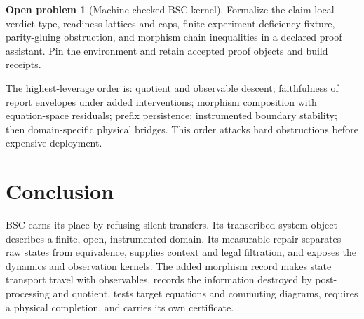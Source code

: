 \documentclass[11pt,a4paper]{article}
\theoremstyle{definition}
\newtheorem{openproblem}[definition]{Open problem}
\theoremstyle{plain}
\theoremstyle{remark}
\begin{document}
\begin{openproblem}[Machine-checked BSC kernel]
Formalize the claim-local verdict type, readiness lattices and caps, finite experiment
deficiency fixture, parity-gluing obstruction, and morphism chain inequalities
in a declared proof assistant.  Pin the environment and retain accepted proof
objects and build receipts.
\end{openproblem}

The highest-leverage order is: quotient and observable descent; faithfulness
of report envelopes under added interventions; morphism composition with
equation-space residuals; prefix persistence; instrumented boundary
stability; then domain-specific physical bridges.  This order attacks hard
obstructions before expensive deployment.

\section{Conclusion}\label{sec:conclusion}

BSC earns its place by refusing silent transfers.  Its transcribed system
object describes a finite, open, instrumented domain.  Its measurable repair separates
raw states from equivalence, supplies context and legal filtration, and exposes
the dynamics and observation kernels.  The added morphism record makes state
transport travel with observables, records the information destroyed by
post-processing and quotient, tests target equations and commuting diagrams,
requires a physical completion, and carries its own certificate.
\end{document}

